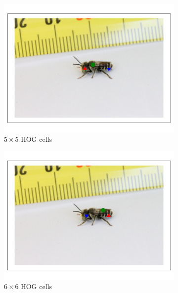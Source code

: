 \documentclass[11pt, oneside]{report}
\begin{document}
\begin{figure}[p]
\begin{subfigure}[b]{0.3\textwidth}
                \centering
                \includegraphics[width=\textwidth]{hog5_3.pdf}
                \caption{$5\times5$ HOG cells}
            \end{subfigure}
            \begin{subfigure}[b]{0.3\textwidth}
                \centering
                \includegraphics[width=\textwidth]{hog6_3.pdf}
                \caption{$6\times6$ HOG cells}
            \end{subfigure}
            \begin{subfigure}[b]{0.3\textwidth}
                \centering

\end{subfigure}
\end{figure}
\end{document}
